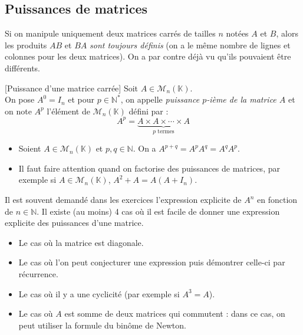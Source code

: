 \documentclass[french,11pt,twoside]{VcCours}
\begin{document}
\subsection{Puissances de matrices}
Si on manipule uniquement deux matrices carrés de tailles $n$ notées $A$ et $B$, alors les produits $AB$ et $BA$ \emph{sont toujours définis} (on a le même nombre de lignes et colonnes pour les deux matrices). On a par contre déjà vu qu'ils pouvaient être différents. 


\begin{Definition}{}[Puissance d'une matrice carrée]
Soit $A \in \mathcal{M}_{n}(\mathbb{K})$.\\
On pose $A^0=I_n$ et pour $p \in \mathbb{N}^*$, on appelle \emph{puissance $p$-ième de la matrice $A$} et on note $A^p$ l'élément de $\mathcal{M}_n(\mathbb{K})$ défini par :
$$A^p= \underbrace{A \times A \times \cdots \times A}_{p \text{ termes}}$$
\end{Definition}

\begin{Remarques}{}
\begin{itemize}
\item Soient $A \in \mathcal{M}_n(\mathbb{K})$ et $p,q \in \mathbb{N}$. On a $A^{p+q}=A^pA^q=A^qA^p.$
\item Il faut faire attention quand on factorise des puissances de matrices, par exemple si $A \in \mathcal{M}_{n}(\mathbb{K})$, \newline $A^2+A = A( A+I_n)$.
\end{itemize}
\end{Remarques}{}

\begin{Methode}{}
Il est souvent demandé dans les exercices l'expression explicite de $A^n$ en fonction de $n \in \mathbb{N}$. Il existe (au moins) 4 cas où il est facile de donner une expression explicite des puissances d'une matrice.
\begin{itemize}
\item Le cas où la matrice est diagonale.
\item Le cas où l'on peut conjecturer une expression puis démontrer celle-ci par récurrence.
\item Le cas où il y a une cyclicité (par exemple si $A^3=A$).
\item Le cas où $A$ est somme de deux matrices qui commutent : dans ce cas, on peut utiliser la formule du binôme de Newton.
\end{itemize}
\end{Methode}
\end{document}
